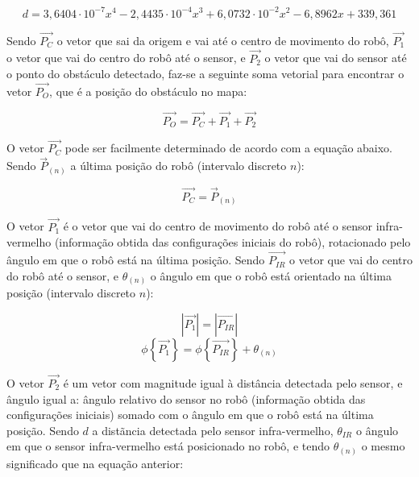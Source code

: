 \begin{equation}
  d = 3,6404 \cdot 10^{-7} x^4 - 2,4435 \cdot 10^{-4} x^3 + 6,0732 \cdot 10^{-2} x^2 - 6,8962 x + 339,361
  \label{eq:IR_dist}
\end{equation}


Sendo $\overrightarrow{P_C}$ o vetor que sai da origem e vai até o centro de movimento do robô, $\overrightarrow{P_1}$ o vetor que vai do centro do robô até o sensor, e $\overrightarrow{P_2}$ o vetor que vai do sensor até o ponto do obstáculo detectado, faz-se a seguinte soma vetorial para encontrar o vetor $\overrightarrow{P_O}$, que é a posição do obstáculo no mapa:

\begin{equation}
  \overrightarrow{P_O} = \overrightarrow{P_C} + \overrightarrow{P_1} + \overrightarrow{P_2}
  \label{eq:IR_vector}
\end{equation}


O vetor $\overrightarrow{P_C}$ pode ser facilmente determinado de acordo com a equação abaixo. Sendo $\overrightarrow{P}_{(n)}$ a última posição do robô (intervalo discreto $n$):

\begin{equation}
  \overrightarrow{P_C} = \overrightarrow{P}_{(n)}
  \label{eq:IR-P_C}
\end{equation}

O vetor $\overrightarrow{P_1}$ é o vetor que vai do centro de movimento do robô até o sensor infra-vermelho (informação obtida das configurações iniciais do robô), rotacionado pelo ângulo em que o robô está na última posição. Sendo $\overrightarrow{P_{IR}}$ o vetor que vai do centro do robô até o sensor, e $\theta_{(n)}$ o ângulo em que o robô está orientado na última posição (intervalo discreto $n$):


\begin{equation}
  |\overrightarrow{P_1}| = |\overrightarrow{P_{IR}}|
  \label{eq:IR-P_1_modulo}
\end{equation}
\begin{equation}
  \phi \left\{ \overrightarrow{P_1} \right\} = \phi \left\{ \overrightarrow{P_{IR}} \right\} + \theta_{(n)}
  \label{eq:IR-P_1_fase}
\end{equation}


O vetor $\overrightarrow{P_2}$ é um vetor com magnitude igual à distância detectada pelo sensor, e ângulo igual a: ângulo relativo do sensor no robô (informação obtida das configurações iniciais) somado com o ângulo em que o robô está na última posição. Sendo $d$ a distãncia detectada pelo sensor infra-vermelho, $\theta_{IR}$ o ângulo em que o sensor infra-vermelho está posicionado no robô, e tendo $\theta_{(n)}$ o mesmo significado que na equação anterior:

